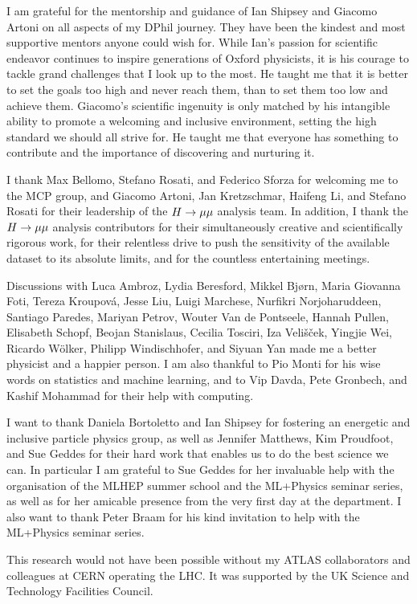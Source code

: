 \begin{acknowledgements}
I am grateful for the mentorship and guidance of Ian Shipsey and Giacomo Artoni
on all aspects of my DPhil journey. They have been the kindest and most
supportive mentors anyone could wish for. While Ian's passion for
scientific endeavor continues to inspire generations of Oxford physicists,
it is his courage to tackle grand challenges that I look up to the most. He
taught me that it is better to set the goals too high and never reach them, than to
set them too low and achieve them. Giacomo's scientific ingenuity is
only matched by his intangible ability to promote a welcoming and inclusive
environment, setting the high standard we should all strive for. He taught me
that everyone has something to contribute and the importance of discovering 
and nurturing it.

I thank Max Bellomo, Stefano Rosati, and Federico Sforza for welcoming me to the MCP
group, and Giacomo Artoni, Jan Kretzschmar, Haifeng Li, and Stefano Rosati
for their leadership of the $H \rightarrow \mu\mu$ analysis team. In addition, I thank the $H \rightarrow \mu\mu$
analysis contributors for their simultaneously creative and scientifically rigorous work,
for their relentless drive to push the sensitivity of the available dataset to its absolute limits,
and for the countless entertaining meetings.

Discussions with Luca Ambroz, Lydia Beresford, Mikkel Bj{\o}rn, Maria Giovanna Foti,
Tereza Kroupov\'a, Jesse Liu, Luigi Marchese,
Nurfikri Norjoharuddeen, Santiago Paredes, Mariyan Petrov, Wouter Van de Pontseele,
Hannah Pullen, Elisabeth Schopf, Beojan Stanislaus, Cecilia Tosciri,
Iza Veli\v{s}\v{c}ek, Yingjie Wei, Ricardo W\"olker, Philipp Windischhofer,
and Siyuan Yan made me a better physicist
and a happier person. I am also thankful to Pio Monti for his wise
words on statistics and machine learning, and to Vip Davda, Pete Gronbech, and
Kashif Mohammad for their help with computing.

I want to thank Daniela Bortoletto and Ian Shipsey for fostering an energetic
and inclusive particle physics group, as well as Jennifer Matthews, Kim Proudfoot,
and Sue Geddes for their hard work that enables us to do the best science we can.
In particular I am grateful to Sue Geddes for her invaluable help with the
organisation of the MLHEP summer school and the ML+Physics seminar series,
as well as for her amicable presence from the very first day at the department. I
also want to thank Peter Braam for his kind invitation to help with the
ML+Physics seminar series.

This research would not have been possible without my ATLAS collaborators
and colleagues at CERN operating the LHC. It was supported by the UK Science and
Technology Facilities Council.
\end{acknowledgements}


